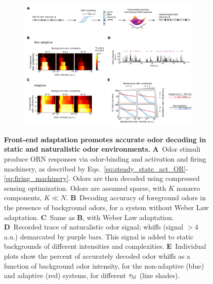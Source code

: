 \documentclass[10pt,prl,aps,showpacs,twocolumn,unsortedaddress,showkeys,linenumbers]{revtex4-1}
\begin{document}
\begin{figure}[t]
	\centering
	\begin{subfigure}[t]{17.7cm}
		\includegraphics[width=17.7cm]{figures/3_decoding_temporal}
		\label{fig:decoding_a}
	\end{subfigure}
	\begin{subfigure}[t]{0\linewidth}
		\label{fig:decoding_b}
	\end{subfigure}
	\begin{subfigure}[t]{0\linewidth}
		\label{fig:decoding_c}
	\end{subfigure}
	\begin{subfigure}[t]{0\linewidth}
		\label{fig:decoding_d}
	\end{subfigure}
	\begin{subfigure}[t]{0\linewidth}
		\label{fig:decoding_e}
	\end{subfigure}
	\caption{\footnotesize{\textbf{Front-end adaptation promotes accurate odor decoding in static and naturalistic odor environments.}
    \textbf{A}~Odor stimuli produce ORN responses via odor-binding and activation and firing machinery, as described by Eqs.~\ref{eq:steady_state_act_OR}-\ref{eq:firing_machinery}. Odors are then decoded using compressed sensing optimization.  Odors are assumed sparse, with $K$ nonzero components, $K \ll N$. 
    \textbf{B}~Decoding accuracy of foreground odors in the presence of background odors, for a system without Weber Law adaptation. 
    \textbf{C}~Same as $\mathbf {B}$, with Weber Law adaptation.
    \textbf{D}~Recorded trace of naturalistic odor signal; whiffs (signal $> 4$ a.u.) demarcated by purple bars. This signal is added to static backgrounds of different intensities and complexities.
    \textbf{E}~Individual plots show the percent of accurately decoded odor whiffs as a function of background odor intensity, for the non-adaptive (blue) and adaptive (red) systems, for different $\tau_{\textup M}$ (line shades). 
    }}
	\label{fig:decoding}
\end{figure}
\end{document}
